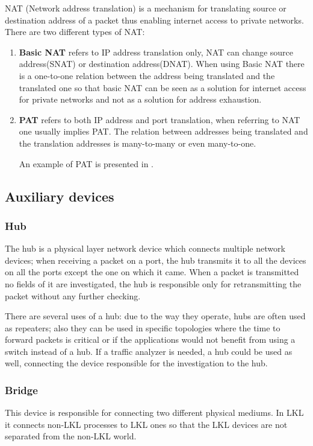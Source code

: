 NAT (Network address translation) is a mechanism for translating source or destination address of a packet thus 
enabling internet access to private networks. There are two different types of NAT:
\begin{enumerate}
\item \textbf{Basic NAT} refers to IP address translation only, NAT can change source address(SNAT) 
or destination address(DNAT). When using Basic NAT there is a one-to-one relation between the address 
being translated and the translated one so that basic NAT can be seen as a solution for internet access 
for private networks and not as a solution for address exhaustion.
\item \textbf{PAT} refers to both IP address and port translation, when referring to NAT one usually implies 
PAT. The relation between addresses being translated and the translation addresses is many-to-many or even many-to-one.

An example of PAT is presented in .
\end{enumerate}
\subsection{Auxiliary devices}
\label{sub-sec:auxdev}

\subsubsection{Hub}
The hub is a physical layer network device which connects multiple network devices; when receiving a packet 
on a port, the hub transmits it to all the devices on all the ports except the one on which it came. When a 
packet is transmitted no fields of it are investigated, the hub is responsible only for retransmitting the packet 
without any further checking.

There are several uses of a hub: due to the way they operate, hubs are often used as repeaters; also they can be 
used in specific topologies where the time to forward packets is critical or if the applications would not benefit 
from using a switch instead of a hub. If a traffic analyzer is needed, a hub could be used as well, connecting 
the device responsible for the investigation to the hub.
\subsubsection{Bridge}
This device is responsible for connecting two different physical mediums. In LKL it connects non-LKL processes to 
LKL ones so that the LKL devices are not separated from the non-LKL world.
